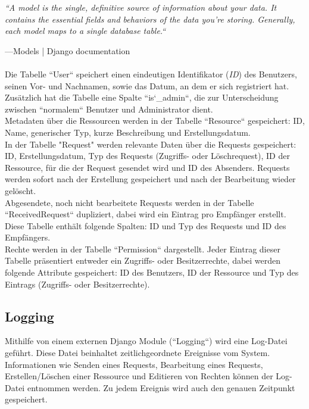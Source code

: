 \documentclass[parskip=full,11pt]{scrartcl}
\begin{document}
    \begin{center}
    \textit{``A model is the single, definitive source of information about your data. It contains the essential fields and behaviors of the data you’re storing. Generally, each model maps to a single database table.``}
    \end{center}
    —Models | Django documentation\\\\
    
Die Tabelle ``User`` speichert einen eindeutigen Identifikator (\textit{ID}) des Benutzers, seinen Vor- und Nachnamen, sowie das Datum, an dem er sich registriert hat. Zusätzlich hat die Tabelle eine Spalte ``is\char`_admin``, die zur Unterscheidung zwischen ``normalem`` Benutzer und Administrator dient.\\
Metadaten über die Ressourcen werden in der Tabelle ``Resource`` gespeichert: ID, Name, generischer Typ, kurze Beschreibung und Erstellungsdatum.\\
In der Tabelle "Request" werden relevante Daten über die Requests gespeichert: ID, Erstellungsdatum, Typ des Requests (Zugriffs- oder Löschrequest), ID der Ressource, für die der Request gesendet wird und ID des Absenders. Requests werden sofort nach der Erstellung gespeichert und nach der Bearbeitung wieder gelöscht.\\
Abgesendete, noch nicht bearbeitete Requests werden in der Tabelle ``ReceivedRequest`` dupliziert, dabei wird ein Eintrag pro Empfänger erstellt. Diese Tabelle enthält folgende Spalten: ID und Typ des Requests und ID des Empfängers.\\
Rechte werden in der Tabelle ``Permission`` dargestellt. Jeder Eintrag dieser Tabelle präsentiert entweder ein Zugriffs- oder Besitzerrechte, dabei werden folgende Attribute gespeichert: ID des Benutzers, ID der Ressource und Typ des Eintrags (Zugriffs- oder Besitzerrechte).
   \\
 
 \subsection{Logging}
 Mithilfe von einem externen Django Module (``Logging``) wird eine Log-Datei geführt. Diese Datei beinhaltet zeitlichgeordnete Ereignisse vom System. Informationen wie Senden eines Requests, Bearbeitung eines Requests, Erstellen/Löschen einer Ressource und Editieren von Rechten können der Log-Datei entnommen werden. Zu jedem Ereignis wird auch den genauen Zeitpunkt gespeichert.
 
\end{document}
